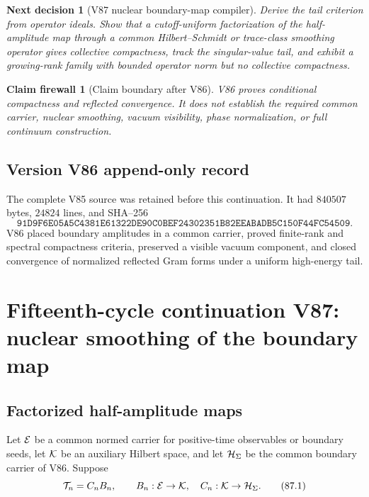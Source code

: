 \documentclass[11pt]{article}
\newtheorem{firewall}[theorem]{Claim firewall}
\newtheorem{decision}[theorem]{Next decision}
\theoremstyle{remark}
\begin{document}
\begin{decision}[V87 nuclear boundary-map compiler]
\label{dec:v15v86-next}
Derive the tail criterion from operator ideals.  Show that a
cutoff-uniform factorization of the half-amplitude map through a
common Hilbert--Schmidt or trace-class smoothing operator gives
collective compactness, track the singular-value tail, and exhibit
a growing-rank family with bounded operator norm but no collective
compactness.
\end{decision}

\begin{firewall}[Claim boundary after V86]
\label{fire:v15v86}
V86 proves conditional compactness and reflected convergence.  It
does not establish the required common carrier, nuclear smoothing,
vacuum visibility, phase normalization, or full continuum
construction.
\end{firewall}

\section*{Version V86 append-only record}
The complete V85 source was retained before this continuation.  It
had \(840507\) bytes, \(24824\) lines, and SHA--256
\[
 \texttt{91D9F6E05A5C4381E61322DE90C0BEF24302351B82EEABADB5C150F44FC54509}.
\]
V86 placed boundary amplitudes in a common carrier, proved
finite-rank and spectral compactness criteria, preserved a visible
vacuum component, and closed convergence of normalized reflected
Gram forms under a uniform high-energy tail.

\chapter{Fifteenth-cycle continuation V87: nuclear smoothing of the boundary map}
\label{sec:v15v87}

\section{Factorized half-amplitude maps}

Let \({\cal E}\) be a common normed carrier for positive-time
observables or boundary seeds, let \({\cal K}\) be an auxiliary
Hilbert space, and let \({\cal H}_\Sigma\) be the common boundary
carrier of V86.  Suppose
\[
 {\cal T}_n=C_nB_n,\qquad
 B_n:{\cal E}\to{\cal K},\quad
 C_n:{\cal K}\to{\cal H}_\Sigma.                      \tag{87.1}
\]
\end{document}
